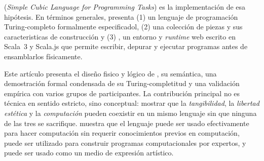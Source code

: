 \sculpt (\emph{Simple Cubic Language for Programming Tasks}) es la
implementaci\'on de esa hip\'otesis. En t\'erminos generales, \sculpt
presenta (1) un lenguaje de programaci\'on Turing-completo formalmente especificadol, (2) una colecci\'on de piezas y sus caracteristicas de construcci\'on y
(3) \sculpter, un entorno y \emph{runtime} web escrito en Scala~3 y
Scala.js que permite escribir, depurar y ejecutar programas antes de
ensamblarlos f\'isicamente.

Este art\'iculo presenta el dise\~no fisico y l\'ogico de \sculpt, su sem\'antica, una
demostraci\'on formal condensada de su Turing-completitud y una
validaci\'on emp\'irica con varios grupos de participantes. La contribuci\'on principal
no es t\'ecnica en sentido estricto, sino conceptual: mostrar que la
\emph{tangibilidad}, la \emph{libertad est\'etica} y la
\emph{computaci\'on} pueden coexistir en un mismo lenguaje
sin que ninguna de las tres se sacrifique. \sculpt muestra que el lenguaje
puede ser usado efectivamente para hacer computación sin requerir conocimientos 
previos en computación, puede ser utilizado para construir programas 
computacionales por expertos, y puede ser usado como un medio de expresión artístico.

\endinput
